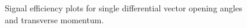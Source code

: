 \documentclass{article}
\begin{document}
\begin{figure}
    \caption{Signal efficiency plots for single differential vector opening angles and transverse momentum.}
    \label{fig:sbnd-signal-efficiency-opening-angles-transverse}
\end{figure}
\end{document}
